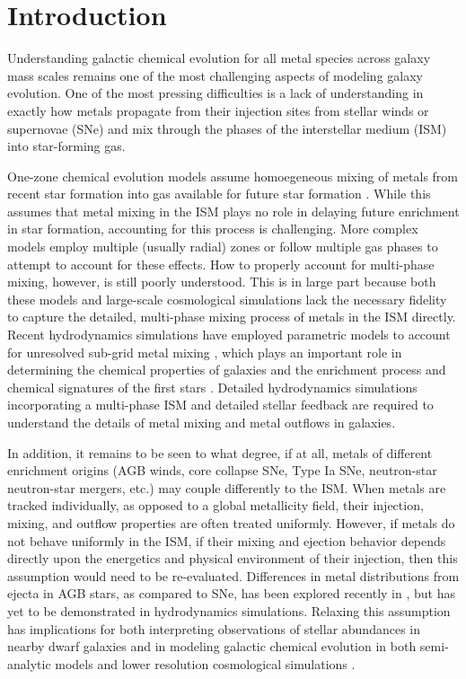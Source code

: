 \section{Introduction}
Understanding galactic chemical evolution for all metal species across galaxy mass scales remains one of the most challenging aspects of modeling galaxy evolution. One of the most pressing difficulties is a lack of understanding in exactly how metals propagate from their injection sites from stellar winds or supernovae (SNe) and mix through the phases of the interstellar medium (ISM) into star-forming gas.

One-zone chemical evolution models assume homoegeneous mixing of metals from recent star formation into gas available for future star formation \citep[e.g.][]{Lanfranchi2006b,Kirby2011-III,Cote2017a,Andrews2017}. While this assumes that metal mixing in the ISM plays no role in delaying future enrichment in star formation, accounting for this process is challenging. More complex models \citep[e.g.][]{SchonrichBinney2009,Pezzulli2016} employ multiple (usually radial) zones or follow multiple gas phases to attempt to account for these effects. How to properly account for multi-phase mixing, however, is still poorly understood. This is in large part because both these models and large-scale cosmological simulations lack the necessary fidelity to capture the detailed, multi-phase mixing process of metals in the ISM directly. Recent hydrodynamics simulations have employed parametric models to account for unresolved sub-grid metal mixing \citep{PanScannapiecoScalo2013,Sarmento2017,Sarmento2018}, which plays an important role in determining the chemical properties of galaxies \citep[e.g.][]{Shen2010, Pilkington2012, Few2012, Brook2014, FengKrumholz2014, Armillotta2018, Escala2018, Rennehan2018}
and the enrichment process and chemical signatures of the first stars \citep[e.g.][]{Jeon2015,Ritter2015,Smith2015}.
Detailed hydrodynamics simulations incorporating a multi-phase ISM and detailed stellar feedback are required to understand the details of metal mixing and metal outflows in galaxies.

In addition, it remains to be seen to what degree, if at all, metals of different enrichment origins (AGB winds, core collapse SNe, Type Ia SNe, neutron-star neutron-star mergers, etc.) may couple differently to the ISM. When metals are tracked individually, as opposed to a global metallicity field, their injection, mixing, and outflow properties are often treated uniformly. However, if metals do not behave uniformly in the ISM, if their mixing and ejection behavior depends directly upon the energetics and physical environment of their injection, then this assumption would need to be re-evaluated. Differences in metal distributions from ejecta in AGB stars, as compared to SNe, has been explored recently in \cite{KrumholzTing2018}, but has yet to be demonstrated in hydrodynamics simulations. Relaxing this assumption has implications for both interpreting observations of stellar abundances in nearby dwarf galaxies and in modeling galactic chemical evolution in both semi-analytic models and lower resolution cosmological simulations \citep[e.g.][]{Cote2018}.

